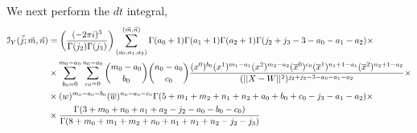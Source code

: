 \documentclass[a4paper,11pt]{article}
\begin{document}
We next perform the $dt$ integral,
\begingroup \allowdisplaybreaks \begin{align}
\mathcal{I}_Y (\vec{j};\vec{m}, \vec{n}) &= \bigg( \frac{(-2\pi i)^3}{\Gamma(j_2) \Gamma(j_3)} \bigg) \sum_{(a_0,a_1,a_2)}^{(\vec{m},\vec{n})} \Gamma(a_0+1) \Gamma(a_1+1) \Gamma(a_2+1) \Gamma(j_2+j_3-3-a_0-a_1-a_2) \times \notag \\
&\times \sum_{b_0=0}^{m_0-a_0}  \sum_{c_0=0}^{n_0-a_0} {m_0-a_0 \choose b_0} {n_0 -a_0 \choose c_0} \frac{(x^0)^{b_0} (x^1)^{m_1-a_1} (x^2)^{m_2-a_2} (\overline{x}^0)^{c_0} (\overline{x}^1)^{n_1+1-a_1} (\overline{x}^2)^{n_2+1-a_2}}{(\vert \vert X-W \vert \vert^2)^{j_2+j_3-3-a_0-a_1-a_2}} \times \notag \\
 & \times (w)^{m_0-a_0-b_0} (\overline{w})^{n_0-a_0-c_0} \Gamma(5+m_1+m_2+n_1+n_2+a_0+b_0+c_0-j_3-a_1-a_2) \times \notag \\
 & \times \frac{\Gamma(3+m_0+n_0+a_1+a_2-j_2-a_0-b_0-c_0)}{\Gamma(8+m_0+m_1+m_2+n_0+n_1+n_1+n_2-j_2-j_3)} \label{eq: I_Y}
\end{align} \endgroup
\end{document}
